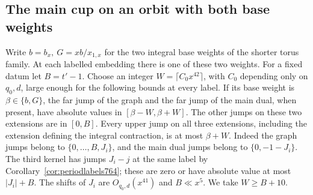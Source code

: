 \documentclass[a4paper,11pt]{article}
\theoremstyle{definition}
\theoremstyle{remark}
\numberwithin{equation}{section}
\begin{document}
\subsection{The main cup on an orbit with both base weights}
\label{sec:mainorbit776}
Write \(b=b_x,\ G=xb/x_{1,x}\) for the two integral base
weights of the shorter torus family. At each labelled
embedding there is one of these two weights. For a fixed
datum let \(B=t'-1\). Choose an integer
\(W=\lceil C_0 x^{42}\rceil\), with \(C_0\) depending only on
\(q_0,d\), large enough for the following bounds at every
label. If its base weight is \(\beta\in\{b,G\}\), the far
jump of the graph and the far jump of the main dual, when
present, have absolute values in \([\beta-W,\beta+W]\).
The other jumps on these two extensions are in \([0,B]\).
Every upper jump on all three extensions, including the
extension defining the integral contraction, is at most
\(\beta+W\). Indeed the graph jumps belong to
\(\{0,\ldots,B,J_i\}\), and the main dual jumps belong to
\(\{0,-1-J_i\}\). The third kernel has jumps \(J_i-j\)
at the same label by Corollary~\ref{cor:periodlabels764};
these are zero or have absolute value at most \(|J_i|+B\).
The shifts of \(J_i\) are \(O_{q_0,d}(x^{41})\) and
\(B\ll x^5\). We take \(W\ge B+10\).
\end{document}
